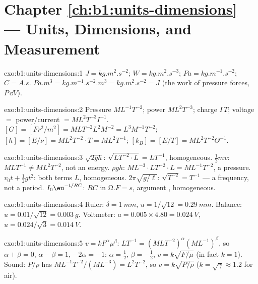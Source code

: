 \section*{Chapter \ref{ch:b1:units-dimensions} --- Units, Dimensions, and Measurement}

\begin{solution}{exo:b1:units-dimensions:1}
$\unit{J} = \unit{kg.m^2.s^{-2}}$; $\unit{W} = \unit{kg.m^2.s^{-3}}$;
$\unit{Pa} = \unit{kg.m^{-1}.s^{-2}}$; $\unit{C} = \unit{A.s}$.
$\unit{Pa.m^3} = \unit{kg.m^{-1}.s^{-2}.m^3} = \unit{kg.m^2.s^{-2}} = \unit{J}$
(the work of pressure forces, $P\,\dd V$).
\end{solution}

\begin{solution}{exo:b1:units-dimensions:2}
Pressure $M L^{-1} T^{-2}$; power $M L^2 T^{-3}$; charge $I\,T$;
voltage $= $ power/current $= M L^2 T^{-3} I^{-1}$.
$[G] = [F r^2/m^2] = M L T^{-2} L^2 M^{-2} = L^3 M^{-1} T^{-2}$;
$[h] = [E/\nu] = M L^2 T^{-2} \cdot T = M L^2 T^{-1}$;
$[k_B] = [E/T] = M L^2 T^{-2} \Theta^{-1}$.
\end{solution}

\begin{solution}{exo:b1:units-dimensions:3}
$\sqrt{2gh}$: $\sqrt{L T^{-2} \cdot L} = L T^{-1}$, homogeneous.
$\tfrac12 mv$: $M L T^{-1} \neq M L^2 T^{-2}$, not an energy.
$\rho g h$: $M L^{-3} \cdot L T^{-2} \cdot L = M L^{-1} T^{-2}$, a pressure.
$v_0 t + \tfrac12 g t^2$: both terms $L$, homogeneous.
$2\pi\sqrt{g/\ell}$: $\sqrt{T^{-2}} = T^{-1}$ --- a frequency, not a period.
$I_0\eu^{-t/RC}$: $RC$ in $\unit{\ohm.F} = \unit{s}$, argument , homogeneous.
\end{solution}

\begin{solution}{exo:b1:units-dimensions:4}
Ruler: $\delta = \qty{1}{mm}$, $u = 1/\sqrt{12} = \qty{0.29}{mm}$.
Balance: $u = 0.01/\sqrt{12} = \qty{0.003}{g}$.
Voltmeter: $a = 0.005 \times 4.80 = \qty{0.024}{V}$,
$u = 0.024/\sqrt3 = \qty{0.014}{V}$.
\end{solution}

\begin{solution}{exo:b1:units-dimensions:5}
$v = k F^\alpha \mu^\beta$: $L T^{-1} = (M L T^{-2})^\alpha (M L^{-1})^\beta$,
so $\alpha + \beta = 0$, $\alpha - \beta = 1$, $-2\alpha = -1$:
$\alpha = \tfrac12$, $\beta = -\tfrac12$, $v = k\sqrt{F/\mu}$ (in fact $k = 1$).
Sound: $P/\rho$ has  $M L^{-1} T^{-2} / (M L^{-3}) = L^2 T^{-2}$,
so $v = k\sqrt{P/\rho}$ ($k = \sqrt\gamma \approx 1.2$ for air).
\end{solution}

